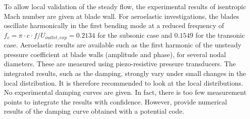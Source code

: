To allow local validation of the steady
flow, the experimental results of 
isentropic Mach number are given at blade wall.
For aeroelastic investigations, the blades oscillate harmonically in the first bending mode
at a reduced frequency of $f_{c} =\pi \cdot c \cdot
f/U_{outlet, exp} = 0.2134$ for the subsonic case and $0.1549$ for the
transonic case. Aeroelastic
results are available such as the first harmonic of the unsteady pressure
coefficient at blade walls (amplitude and phase), for several nodal
diameters. These are measured using piezo-resistive pressure transducers.
The integrated
results, such as the damping, strongly vary under small changes in the
local distribution. It is therefore recommended to look at the local
distributions. No experimental damping curves are given. In fact,
there is too few measurement points to integrate the results with
confidence. However, \citet{Fransson1999}
provide numerical results of the damping curve obtained with a potential code.
